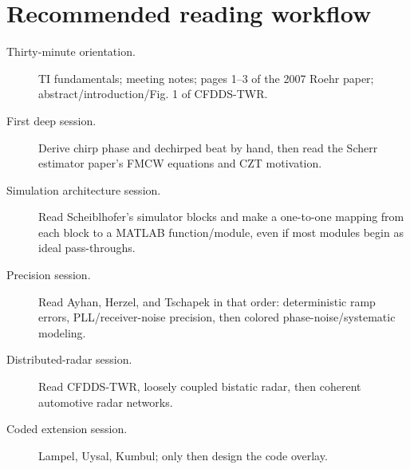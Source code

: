 \documentclass[11pt]{article}
\begin{document}
\section{Recommended reading workflow}
\begin{description}
\item[Thirty-minute orientation.] TI fundamentals; meeting notes; pages 1--3 of the 2007 Roehr paper; abstract/introduction/Fig. 1 of CFDDS-TWR.
\item[First deep session.] Derive chirp phase and dechirped beat by hand, then read the Scherr estimator paper's FMCW equations and CZT motivation.
\item[Simulation architecture session.] Read Scheiblhofer's simulator blocks and make a one-to-one mapping from each block to a MATLAB function/module, even if most modules begin as ideal pass-throughs.
\item[Precision session.] Read Ayhan, Herzel, and Tschapek in that order: deterministic ramp errors, PLL/receiver-noise precision, then colored phase-noise/systematic modeling.
\item[Distributed-radar session.] Read CFDDS-TWR, loosely coupled bistatic radar, then coherent automotive radar networks.
\item[Coded extension session.] Lampel, Uysal, Kumbul; only then design the code overlay.
\end{description}

\clearpage
\end{document}
